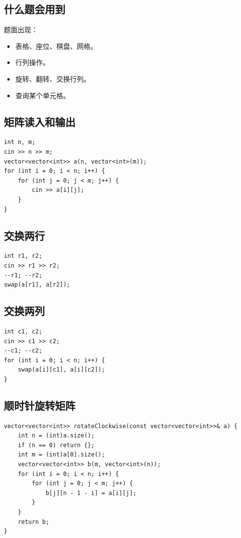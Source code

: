 \subsection{什么题会用到}

题面出现：

\begin{itemize}
  \item 表格、座位、棋盘、网格。
  \item 行列操作。
  \item 旋转、翻转、交换行列。
  \item 查询某个单元格。
\end{itemize}

\subsection{矩阵读入和输出}

\begin{lstlisting}
int n, m;
cin >> n >> m;
vector<vector<int>> a(n, vector<int>(m));
for (int i = 0; i < n; i++) {
    for (int j = 0; j < m; j++) {
        cin >> a[i][j];
    }
}
\end{lstlisting}

\subsection{交换两行}

\begin{lstlisting}
int r1, r2;
cin >> r1 >> r2;
--r1; --r2;
swap(a[r1], a[r2]);
\end{lstlisting}

\subsection{交换两列}

\begin{lstlisting}
int c1, c2;
cin >> c1 >> c2;
--c1; --c2;
for (int i = 0; i < n; i++) {
    swap(a[i][c1], a[i][c2]);
}
\end{lstlisting}

\subsection{顺时针旋转矩阵}

\begin{lstlisting}
vector<vector<int>> rotateClockwise(const vector<vector<int>>& a) {
    int n = (int)a.size();
    if (n == 0) return {};
    int m = (int)a[0].size();
    vector<vector<int>> b(m, vector<int>(n));
    for (int i = 0; i < n; i++) {
        for (int j = 0; j < m; j++) {
            b[j][n - 1 - i] = a[i][j];
        }
    }
    return b;
}
\end{lstlisting}


